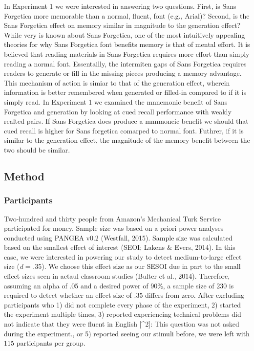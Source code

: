 \documentclass[english,doc]{apa6}
\begin{document}
In Experiment 1 we were interested in answering two questions. First, is Sans Forgetica more memorable than a normal, fluent, font (e.g., Arial)? Second, is the Sans Forgetica effect on memory similar in magnitude to the generation effect? While very is known about Sans Forgetica, one of the most intuitively appealing theories for why Sans Forgetica font benefits memory is that of mental effort. It is believed that reading materials in Sans Forgetica requires more effort than simply reading a normal font. Essentailly, the intermiten gaps of Sans Forgetica requires readers to generate or fill in the missing pieces producing a memory advantage. This mechanism of action is simiar to that of the generation effect, wherein information is better remembered when generated or filled-in compared to if it is simply read. In Experiment 1 we examined the mnnemonic benefit of Sans Forgetica and generation by looking at cued recall performance with weakly realted pairs. If Sans Forgetica does produce a mnnmoneic benefit we should that cued recall is higher for Sans forgetica comarped to normal font. Futhrer, if it is similar to the generation effect, the magnitude of the memory benefit between the two should be similar.

\hypertarget{method}{%
\subsection{Method}\label{method}}

\hypertarget{participants}{%
\subsubsection{Participants}\label{participants}}

Two-hundred and thirty people from Amazon's Mechanical Turk Service participated for money. Sample size was based on a priori power analyses conducted using PANGEA v0.2 (Westfall, 2015). Sample size was calculated based on the smallest effect of interest (SEOI; Lakens \& Evers, 2014). In this case, we were interested in powering our study to detect medium-to-large effect size (\emph{d} = .35). We choose this effect size as our SESOI due in part to the small effect sizes seen in actaul classroom studies (Bulter et al., 2014). Therefore, assuming an alpha of .05 and a desired power of 90\%, a sample size of 230 is required to detect whether an effect size of .35 differs from zero. After excluding participants who 1) did not complete every phase of the experiment, 2) started the experiment multiple times, 3) reported experiencing technical problems did not indicate that they were fluent in English {[}\^{}2{]}: This question was not asked during the experiment., or 5) reported seeing our stimuli before, we were left with 115 participants per group.
\end{document}
